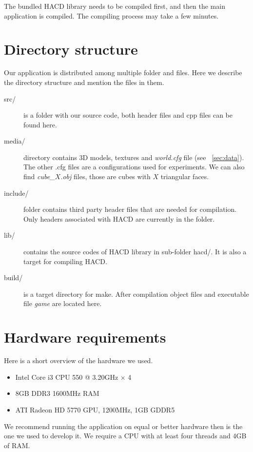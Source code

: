The bundled HACD library needs to be compiled first, and then the main application is compiled. The compiling process may take a few minutes.

\section{Directory structure}
Our application is distributed among multiple folder and files. Here we describe the directory structure and mention the files in them.
\begin{description}
\item[src/] is a folder with our source code, both header files and cpp files can be found here.
\item[media/] directory contains 3D models, textures and \emph{world.cfg}  file (see ~\cref{sec:data}). The other .cfg files are a configurations used for experiments. We can also find \emph{cube\_$X$.obj} files, those are cubes with $X$ triangular faces.
\item[include/] folder contains third party header files that are needed for compilation. Only headers associated with HACD are currently in the folder.
\item[lib/] contains the source codes of HACD library in sub-folder hacd/. It is also a target for compiling HACD.
\item[build/] is a target directory for make. After compilation object files and executable file \emph{game} are located here. 
\end{description}

\section{Hardware requirements}
Here is a short overview of the hardware we used.
\begin{itemize}
\item Intel Core i3 CPU 550 @ 3.20GHz $\times$ 4 
\item 8GB DDR3 1600MHz RAM
\item ATI Radeon HD 5770 GPU, 1200MHz, 1GB GDDR5
\end{itemize}
We recommend running the application on equal or better hardware then is the one we used to develop it. We require a CPU with at least four threads and 4GB of RAM.

